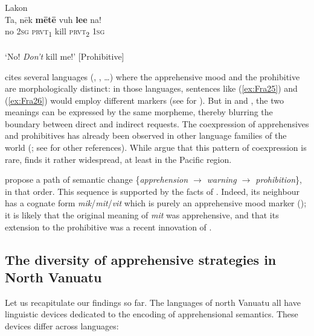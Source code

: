 \documentclass[output=paper,colorlinks,citecolor=brown]{langscibook}
\begin{document}
\ea \label{ex:Fra28} \textnormal{Lakon}  \\
\gll Ta, nēk \textbf{mētē} vuh \textbf{lee} na! \\
no \textsc{2sg} \textsc{prvt}\textsubscript{1} kill \textsc{prvt}\textsubscript{2} \textsc{1sg} \\
 \\
`No! \textit{Don't} kill me!' \hfill [Prohibitive]
\z

 cites several languages (, ,  {\ldots}) where the apprehensive mood and the prohibitive are morphologically distinct: in those languages, sentences like (\ref{ex:Fra25}) and (\ref{ex:Fra26}) would employ different markers (see  for ). But in  and , the two meanings can be expressed by the same morpheme, thereby blurring the boundary between direct and indirect requests. 
The coexpression of apprehensives and prohibitives has already been observed in other language families of the world (\citealt[50--63]{Dobrushina2006}; see \citet{chapters/introduction} for other references). While \citet{pakendorfschalley2007} argue that this pattern of coexpression is rare, \citet[453]{smithdennis2021} finds it rather widespread, at least in the Pacific region. 

\citet[525]{pakendorfschalley2007} propose a path of semantic change \{\textit{apprehension $\rightarrow$ warning $\rightarrow$ prohibition}\}, in that order. This sequence is supported by the facts of . Indeed, its neighbour  has a cognate form \textit{mik}/\textit{mit}/\textit{vit} which is purely an apprehensive mood marker (); it is likely that the original meaning of \textit{mit} was apprehensive, and that its extension to the prohibitive was a recent innovation of .



\subsection{The diversity of apprehensive strategies in North Vanuatu}
\label{subsec:synthesis}

Let us recapitulate our findings so far. The languages of north Vanuatu all have linguistic devices dedicated to the encoding of apprehensional semantics. These devices differ across languages: 
\end{document}
